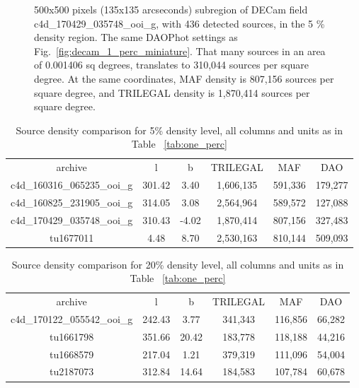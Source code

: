 \documentclass[DM,lsstdraft,toc,usenatbib]{lsstdoc}
\begin{document}
\begin{figure}
\begin{minipage}[t]{0.5\linewidth}
\caption{500x500 pixels (135x135 arcseconds) subregion of DECam field c4d\_170429\_035748\_ooi\_g,  with 436  detected sources, in the 5 \% density region. The same DAOPhot settings as Fig.~\ref{fig:decam_1_perc_miniature}. That many sources in an area of 0.001406 sq degrees,  translates to 310,044 sources per square degree. At the same coordinates, MAF density is 807,156 sources per square degree, and TRILEGAL density is 1,870,414 sources per square degree. }
\label{fig:decam_5_perc_miniature}
\end{minipage}%
\end{figure}


\begin{table}
\begin{tabular}{cccccc}
archive & l & b & TRILEGAL & MAF & DAO \\
c4d\_160316\_065235\_ooi\_g & 301.42 & 3.40 & 1,606,135 & 591,336 & 179,277 \\
c4d\_160825\_231905\_ooi\_g & 314.05 & 3.08 & 2,564,964 & 589,572 & 127,088 \\
c4d\_170429\_035748\_ooi\_g & 310.43 & -4.02 & 1,870,414 & 807,156 & 327,483 \\
tu1677011 & 4.48 & 8.70 & 2,530,163 & 810,144 & 509,093 \\
\end{tabular}
\caption{Source density comparison for 5\% density level, all columns and units as in Table ~\ref{tab:one_perc}}
\label{tab:five_perc}
\end{table}



\begin{table}
\begin{tabular}{cccccc}
archive & l & b & TRILEGAL & MAF & DAO \\
c4d\_170122\_055542\_ooi\_g & 242.43 & 3.77 & 341,343 & 116,856 & 66,282 \\
tu1661798 & 351.66 & 20.42 & 183,778 & 118,188 & 44,216 \\
tu1668579 & 217.04 & 1.21 & 379,319 & 111,096 & 54,004 \\
tu2187073 & 312.84 & 14.64 & 184,583 & 107,784 & 60,678 \\
\end{tabular}
\caption{Source density comparison for 20\% density level, all columns and units as in Table ~\ref{tab:one_perc}}
\label{tab:twenty_perc}
\end{table}

\end{document}
